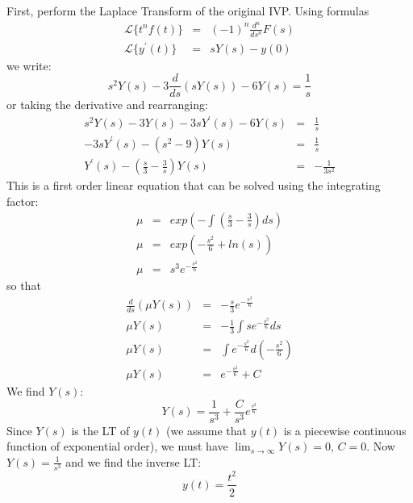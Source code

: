 \documentclass[11pt]{article}
\begin{document}
\begin{solution}

  First, perform the Laplace Transform of the original IVP. Using formulas
  \begin{eqnarray*}
    \mathcal{L}\{t^{n}f(t)\} & = & (-1)^{n}\frac{d^{n}}{ds^{n}} F(s) \\
    \mathcal{L}\{y^{\prime}(t)\} & = & sY(s) - y(0)
  \end{eqnarray*}
  we write:
  \[ s^2 Y(s) - 3 \frac {d} {ds} \left( s Y(s) \right) - 6Y(s) = \frac {1} {s} \]
  or taking the derivative and rearranging:
  \begin{eqnarray*}
    s^2 Y(s) -3 Y(s) - 3 s Y^{\prime}(s) - 6 Y(s) & = & \frac {1} {s} \\
    -3 s Y^{\prime}(s) - \left( s^2 - 9 \right) Y(s) & = & \frac {1} {s} \\
    Y^{\prime}(s) - \left( \frac {s} {3} - \frac {3} {s} \right) Y(s) & = & - \frac {1} {3 s^2}
  \end{eqnarray*}
  This is a first order linear equation that can be solved using the integrating
  factor:
  \begin{eqnarray*}
    \mu & = & exp\left( - \int \left( \frac {s} {3} - \frac {3} {s} \right) ds \right) \\
    \mu & = & exp\left( - \frac {s^2} {6} + ln(s) \right) \\
    \mu & = & s^3 e^{-\frac {s^2} {6}}
  \end{eqnarray*}
  so that
  \begin{eqnarray*}
    \frac {d} {ds} \left( \mu Y(s) \right) & = & - \frac {s} {3} e^{-\frac {s^2} {6}} \\
    \mu Y(s) & = & - \frac {1} {3} \int s e^{-\frac {s^2} {6}} ds \\
    \mu Y(s) & = & \int e^{-\frac {s^2} {6}} d\left( - \frac {s^2} {6}  \right) \\
    \mu Y(s) & = & e^{-\frac {s^2} {6}} + C
  \end{eqnarray*}
  We find $Y(s)$:
  \[ Y(s) = \frac {1} {s^3} + \frac {C} {s^3} e^{\frac {s^2} {6}} \]
  Since $Y(s)$ is the LT of $y(t)$ (we assume that $y(t)$ is a 
  piecewise continuous function of exponential order), we must have
  $ \lim_{s \to \infty} Y(s) =0$, $C=0$. Now $Y(s) = \frac {1} {s^3}$ and we find
  the inverse LT:
  \begin{equation*}
    \boxed{y(t) = \frac {t^2} {2}}
  \end{equation*}
\end{solution}
\end{document}
